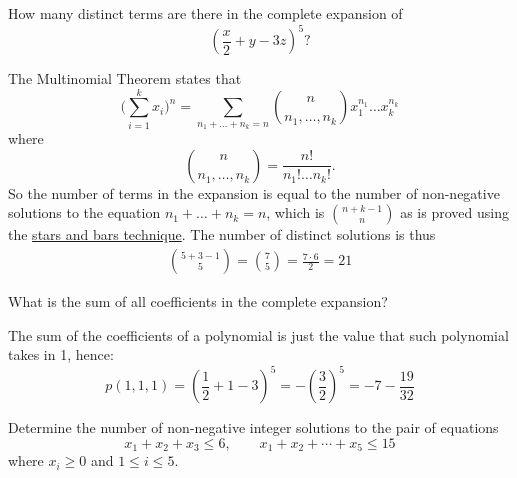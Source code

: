 \documentclass[a4paper, english, 12pt]{article} %
\begin{document}
\titlebox


\begin{problem}[16]
  \begin{subproblem}[2]
    How many distinct terms are there in the complete expansion of
    \begin{equation*}
      \left( \frac{x}{2} + y - 3z \right)^5 ?
    \end{equation*}
  \end{subproblem}
\end{problem}

\begin{answer}
  The Multinomial Theorem states that
  \begin{equation*}
    \biggl( \sum_{i=1}^k x_i\biggr)^n
    = \sum_{n_1 + \dots + n_k = n} \binom{n}{n_1, \dots, n_k}x_1^{n_1}\dots x_k^{n_k}
  \end{equation*}
  where
  \begin{equation*}
    \binom{n}{n_1, \dots, n_k} = \frac{n!}{n_1!\dots n_k!}.
  \end{equation*}
  So the number of terms in the expansion is equal to the number of non-negative
  solutions to the equation $n_1 + \dots + n_k = n$, which is
  $\binom{n+k-1}{n}$ as is proved using the
  \href{http://en.wikipedia.org/wiki/Stars_and_bars_(combinatorics)}{stars and
    bars technique}. The number of distinct solutions is thus
  \begin{align*}
    \binom{5 + 3 - 1}{5} = \binom{7}{5} = \frac{7 \cdot 6}{2} = 21
  \end{align*}
\end{answer}

\begin{subproblem}
  What is the sum of all coefficients in the complete expansion?
\end{subproblem}

\begin{answer}
  The sum of the coefficients of a polynomial is just the value that such
  polynomial takes in 1, hence:
  \begin{equation*}
    p(1,1,1) = \left( \frac{1}{2} + 1 - 3 \right)^5 =- \left( \frac{3}{2} \right)^5
    = - 7 - \frac{19}{32}
  \end{equation*}
\end{answer}

\begin{problem}[18]
  \begin{subproblem}[2]
    Determine the number of non-negative integer solutions to the pair of
    equations
    \begin{equation*}
      x_1 + x_2 + x_3 \leq 6, \qquad x_1 + x_2 + \cdots + x_5 \leq 15
    \end{equation*}
    where $x_i \geq 0$ and $1 \leq i \leq 5$. 
  \end{subproblem}
\end{problem}
\end{document}
